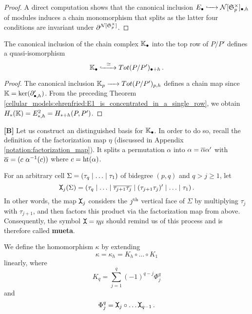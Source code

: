 \begin{proof}
A direct computation shows that the canonical inclusion $E_\bullet \xhookrightarrow{\hspace{6pt}{}\hspace{6pt}} \mathcal N[\mathfrak S^\times_p]_{\bullet,h}$ of modules induces a chain monomorphism that splits
as the latter four conditions are invariant under $\partial^{\mathcal N[\mathfrak S^\times_p]}$.
\end{proof}

\begin{cor}
    \label{cellular_models:ehrenfried:KK_is_qi_subcomplex}
    The canonical inclusion of the chain complex $\mathbb K_\bullet$ into the top row of $P/P'$ defines a quasi-isomorphism
    \[
        \mathbb K_\bullet \xhookrightarrow{\hspace{6pt}{\simeq}\hspace{6pt}} Tot(P/P')_{\bullet + h} \,.
    \]
\end{cor}

\begin{proof}
    The canonical inclusion $\mathbb K_p \xrightarrow{\hspace{6pt}{}\hspace{6pt}} Tot(P/P')_{p,h}$ defines a chain map since $\mathbb K = \ker( \partial'_{\bullet,h} )$.
    From the preceding Theorem \ref{cellular_models:ehrenfried:E1_is_concentrated_in_a_single_row}, we obtain
    $H_\ast(\mathbb K) = E^2_{\ast,h} = H_{\ast+h}(P,P')$.
\end{proof}

{\bf [B]} Let us construct an distinguished basis for $\mathbb K_\bullet$.
In order to do so, recall the definition of the factorization map $\eta$ (discussed in Appendix \ref{notation:factorization_map}).
It splits a permutation $\alpha$ into $\alpha = \overline \alpha \alpha'$ with $\overline \alpha = ( c\ \alpha^{-1}(c))$ where $c = \operatorname{ht}(\alpha)$.

\begin{defi}
    \label{cellular_models:ehrenfried:mueta}
    For an arbitrary cell $\Sigma = \inhomq$ of bidegree $(p,q)$ and $q > j \ge 1$, let
    \[
        \mueta_j (\Sigma) = (\tau_q \mid \ldots \mid \ov{\tau_{j+1}\tau_j} \mid (\tau_{j+1}\tau_j)' \mid \ldots \mid \tau_1) \,.
    \]
    In other words, the map $\mueta_j$ considers the $j^{\text{th}}$ vertical face of $\Sigma$ by multiplying $\tau_j$ with $\tau_{j+1}$,
    and then factors this product via the factorization map from above.
    Consequently, the symbol $\mueta = \eta\mu$ should remind us of this process and is therefore called {\bf mueta}.
\end{defi}

\begin{defi}
    \label{cellular_models:ehrenfried:definition_kappa}
    We define the homomorphism $\kappa$ by extending
    \[
        \kappa = \kappa_h = K_h \circ \ldots \circ K_1
    \]
    linearly, where
    \[
        K_q = \sum_{j=1}^q (-1)^{q-j} \Phi_{j}^q
    \]
    and
    \[
        \Phi_j^q = \mueta_j \circ \ldots \mueta_{q-1} \,.
    \]
\end{defi}


